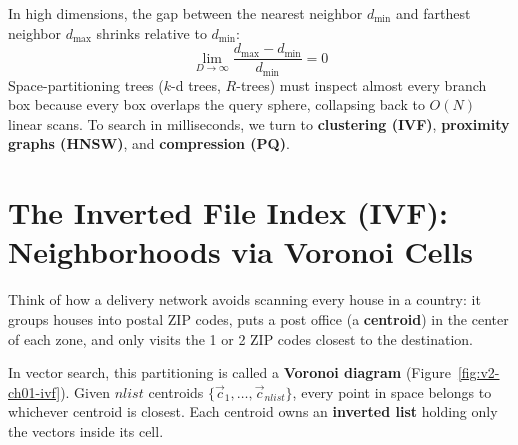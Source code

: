 In high dimensions, the gap between the nearest neighbor $d_{\min}$ and farthest neighbor $d_{\max}$ shrinks relative to $d_{\min}$:
\begin{equation}
\lim_{D \to \infty} \frac{d_{\max} - d_{\min}}{d_{\min}} = 0
\end{equation}
Space-partitioning trees ($k$-d trees, $R$-trees) must inspect almost every branch box because every box overlaps the query sphere, collapsing back to $O(N)$ linear scans. To search in milliseconds, we turn to \textbf{clustering (IVF)}, \textbf{proximity graphs (HNSW)}, and \textbf{compression (PQ)}.

\section{The Inverted File Index (IVF): Neighborhoods via Voronoi Cells}

Think of how a delivery network avoids scanning every house in a country: it groups houses into postal ZIP codes, puts a post office (a \textbf{centroid}) in the center of each zone, and only visits the 1 or 2 ZIP codes closest to the destination.

In vector search, this partitioning is called a \textbf{Voronoi diagram} (Figure~\ref{fig:v2-ch01-ivf}). Given $nlist$ centroids $\{\vec{c}_1, \dots, \vec{c}_{nlist}\}$, every point in space belongs to whichever centroid is closest. Each centroid owns an \textbf{inverted list} holding only the vectors inside its cell.


